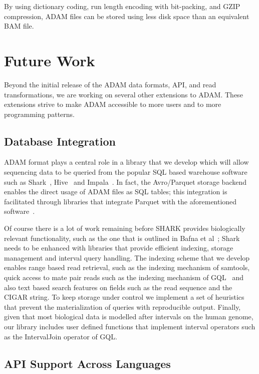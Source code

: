 \documentclass[10pt,twocolumn]{article}
\theoremstyle{plain}
\begin{document}
By using dictionary coding, run length encoding with bit-packing, and GZIP compression, ADAM files can be stored using less
disk space than an equivalent BAM file. 

\section{Future Work}
\label{sec:future-work}

Beyond the initial release of the ADAM data formats, API, and read transformations, we are working on several other
extensions to ADAM. These extensions strive to make ADAM accessible to more users and to more programming patterns.

\subsection{Database Integration}
\label{sec:database-integration}

ADAM format plays a central role in a library that we develop which will allow sequencing data to be queried from 
the popular SQL based warehouse software such as Shark~\cite{shark}, Hive~\cite{hive} and Impala~\cite{impala}. In fact,
the Avro/Parquet storage backend enables the direct usage of ADAM files as SQL tables; this integration is facilitated through libraries 
that integrate Parquet with the aforementioned software~\cite{parquet}.

Of course there is a lot of work remaining before SHARK provides biologically relevant functionality,
such as the one that is outlined in Bafna et al~\cite{bafna2013}; Shark needs to be enhanced with libraries that provide
efficient indexing, storage management and interval query handling. The indexing scheme that we develop enables
range based read retrieval, such as the indexing mechanism of samtools, quick access to mate pair reads such as the
indexing mechanism of GQL~\cite{kozanitis13} and also text based search features on fields such as the read sequence
and the CIGAR string. To keep storage under control we implement a set of heuristics that prevent the materialization of
queries with reproducible output. Finally, given that most biological data is modelled after intervals on the human genome,
our library includes user defined functions that implement interval operators such as the IntervalJoin operator of GQL.

\subsection{API Support Across Languages}
\label{sec:api-support-across-languages}
\end{document}
